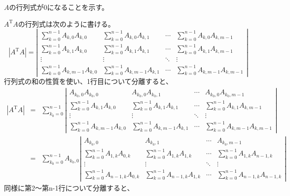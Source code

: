 \documentclass{jsarticle}
\begin{document}
\(A\)の行列式が\(0\)になることを示す。

\(A^\mathrm{T}A\)の行列式は次のように書ける。
\begin{equation}
    |A^\mathrm{T}A|=
    \left|
    \begin{array}{cccc}
        \sum^{n-1}_{k=0}A_{k,0}A_{k,0} & \sum^{n-1}_{k=0}A_{k,0}A_{k,1} & \cdots & \sum^{n-1}_{k=0}A_{k,0}A_{k,m-1} \\
        \sum^{n-1}_{k=0}A_{k,1}A_{k,0} & \sum^{n-1}_{k=0}A_{k,1}A_{k,1} & \cdots & \sum^{n-1}_{k=0}A_{k,1}A_{k,m-1} \\
        \vdots & \vdots & \ddots & \vdots \\
        \sum^{n-1}_{k=0}A_{k,m-1}A_{k,0} &\sum^{n-1}_{k=0}A_{k,m-1}A_{k,1} & \cdots & \sum^{n-1}_{k=0}A_{k,m-1}A_{k,m-1}
    \end{array}
    \right|
\end{equation}
行列式の和の性質を使い、1行目について分離すると、
\begin{eqnarray*}
    |A^\mathrm{T}A|&=&
    \sum^{n-1}_{k_0=0}
    \left|
    \begin{array}{cccc}
        A_{k_0,0}A_{k_0,0} & A_{k_0,0}A_{k_0,1} & \cdots & A_{k_0,0}A_{k_0,m-1} \\
        \sum^{n-1}_{k=0}A_{k,1}A_{k,0} & \sum^{n-1}_{k=0}A_{k,1}A_{k,1} & \cdots & \sum^{n-1}_{k=0}A_{k,1}A_{k,m-1} \\
        \vdots & \vdots & \ddots & \vdots \\
        \sum^{n-1}_{k=0}A_{k,m-1}A_{k,0} &\sum^{n-1}_{k=0}A_{k,m-1}A_{k,1} & \cdots & \sum^{n-1}_{k=0}A_{k,m-1}A_{k,m-1}
    \end{array}
    \right|\\
    &=&
    \sum^{n-1}_{k_0=0}A_{k_0,0}
    \left|
    \begin{array}{cccc}
        A_{k_0,0} & A_{k_0,1} & \cdots & A_{k_0,m-1} \\
        \sum^{n-1}_{k=0}A_{1,k}A_{0,k} & \sum^{n-1}_{k=0}A_{1,k}A_{1,k} & \cdots & \sum^{n-1}_{k=0}A_{1,k}A_{n-1,k} \\
        \vdots & \vdots & \ddots & \vdots \\
        \sum^{n-1}_{k=0}A_{n-1,k}A_{0,k} &\sum^{n-1}_{k=0}A_{n-1,k}A_{1,k} & \cdots & \sum^{n-1}_{k=0}A_{n-1,k}A_{n-1,k}
    \end{array}
    \right|
\end{eqnarray*}
同様に第2～第n-1行について分離すると、
\end{document}
